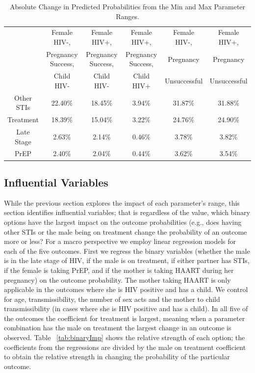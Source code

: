 \documentclass[11pt]{nih_mod}
\begin{document}
\begin{table}[H]	
\begin{center}
\begin{tabular}{|c|c|c|c|c|c|}
\hline
 & Female HIV-,  & Female HIV+, & Female HIV+, & Female HIV-, & Female HIV+,\\ 
 & Pregnancy Success,& Pregnancy Success,&Pregnancy Success,& Pregnancy& Pregnancy\\ 
 & Child HIV-&Child HIV-&Child HIV+&Unsuccessful&Unsuccessful\\ 
\hline
\hline
Other STIs & 22.40\% & 18.45\% & 3.94\% & 31.87\% & 31.88\%\\ 
Treatment & 18.39\% & 15.04\% & 3.22\% & 24.76\% & 24.90\%\\ 
Late Stage & 2.63\% & 2.14\% & 0.46\% & 3.78\% & 3.82\%\\ 
PrEP & 2.40\% & 2.04\% & 0.44\% & 3.62\% & 3.54\%\\
\hline
\end{tabular}
	\caption{Absolute Change in Predicted Probabilities from the Min and Max Parameter Ranges. \label{tab:rangeImp}}
\end{center}
\end{table}

 \subsection{Influential Variables}
While the previous section explores the impact of each parameter's range, this section identifies influential variables; that is regardless of the value, which binary options have the largest impact on the outcome probabilities (e.g., does having other STIs or the male being on treatment change the probability of an outcome more or less? For a macro perspective we employ linear regression models for each of the five outcomes.  First we regress the binary variables (whether the male is in the late stage of HIV, if the male is on treatment, if either partner has STIs, if the female is taking PrEP, and if the mother is taking HAART during her pregnancy) on the outcome probability.  The mother taking HAART is only applicable in the outcomes where she is HIV positive and has a child.  We control for age, transmissibility, the number of sex acts and the mother to child transmissibility (in cases where she is HIV positive and has a child).  In all five of the outcomes the coefficient for treatment is largest, meaning when a parameter combination has the male on treatment the largest change in an outcome is observed.  Table ~\ref{tab:binaryImp} shows the relative strength of each option; the coefficients from the regressions are divided by the male on treatment coefficient to obtain the relative strength in changing the probability of the particular outcome.   
\end{document}
